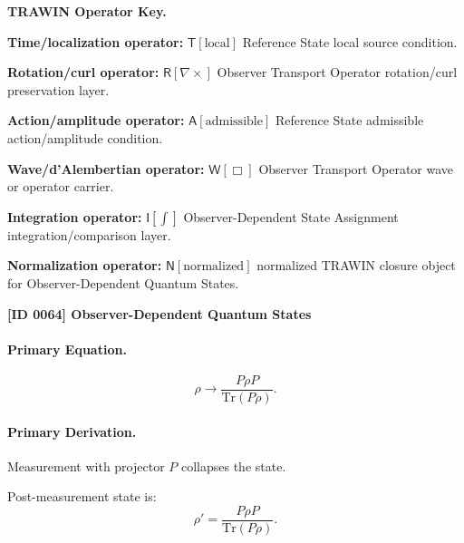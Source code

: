 \par\vspace{0.45\baselineskip}
\noindent\begin{minipage}[t]{\linewidth}
\begingroup
\small
\raggedright
\textbf{TRAWIN Operator Key.}\par
\noindent\textbf{Time/localization operator:} $\mathsf{T}\!\left[\mathrm{local}\right]$ Reference State local source condition.\par
\noindent\textbf{Rotation/curl operator:} $\mathsf{R}\!\left[\nabla\times\right]$ Observer Transport Operator rotation/curl preservation layer.\par
\noindent\textbf{Action/amplitude operator:} $\mathsf{A}\!\left[\mathrm{admissible}\right]$ Reference State admissible action/amplitude condition.\par
\noindent\textbf{Wave/d'Alembertian operator:} $\mathsf{W}\!\left[\Box\right]$ Observer Transport Operator wave or operator carrier.\par
\noindent\textbf{Integration operator:} $\mathsf{I}\!\left[\int\right]$ Observer-Dependent State Assignment integration/comparison layer.\par
\noindent\textbf{Normalization operator:} $\mathsf{N}\!\left[\mathrm{normalized}\right]$ normalized TRAWIN closure object for Observer-Dependent Quantum States.\par
\endgroup
\end{minipage}

\clearpage
\noindent\textbf{[ID 0064] Observer-Dependent Quantum States}\par
\vspace{0.35em}
\paragraph{Primary Equation.}
\begin{equation}
\rho \rightarrow \frac{P \rho P}{\mathrm{Tr}(P\rho)}.
\end{equation}

\paragraph{Primary Derivation.}
Measurement with projector $P$ collapses the state.

Post-measurement state is:
\begin{equation}
\rho' = \frac{P \rho P}{\mathrm{Tr}(P\rho)}.
\end{equation}

